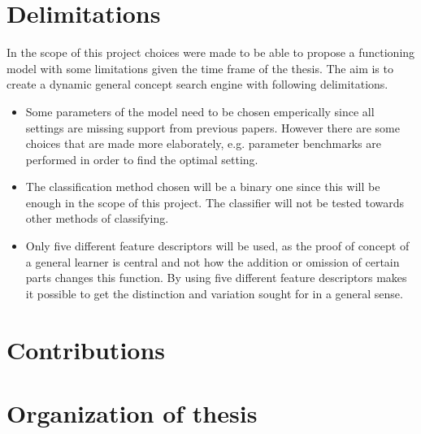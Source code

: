 \section{Delimitations}
\label{sec:intro:delimitations}
In the scope of this project choices were made to be able to propose a functioning model with some limitations given the time frame of the thesis. The aim is to create a dynamic general concept search engine with following delimitations.
\begin{itemize}
	\item Some parameters of the model need to be chosen emperically since all settings are missing support from previous papers. However there are some choices that are made more elaborately, e.g. parameter benchmarks are performed in order to find the optimal setting. 
	\item The classification method chosen will be a binary one since this will be enough in the scope of this project. The classifier will not be tested towards other methods of classifying.
	\item Only five different feature descriptors will be used, as the proof of concept of a general learner is central and not how the addition or omission of certain parts changes this function. By using five different feature descriptors makes it possible to get the distinction and variation sought for in a general sense.
\end{itemize}

\section{Contributions}


\section{Organization of thesis}

